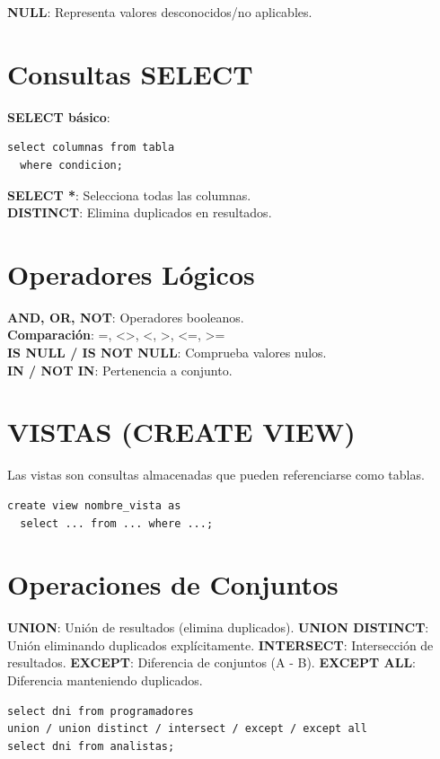 \documentclass[8pt,a4paper,twocolumn]{article}
\begin{document}
\textbf{NULL}: Representa valores desconocidos/no aplicables.

\section{Consultas SELECT}

\textbf{SELECT básico}:
\begin{lstlisting}
select columnas from tabla
  where condicion;
\end{lstlisting}

\textbf{SELECT *}: Selecciona todas las columnas.\\
\textbf{DISTINCT}: Elimina duplicados en resultados.

\section{Operadores Lógicos}

\textbf{AND, OR, NOT}: Operadores booleanos.\\
\textbf{Comparación}: =, \textless\textgreater, \textless, \textgreater, \textless=, \textgreater=\\
\textbf{IS NULL / IS NOT NULL}: Comprueba valores nulos.\\
\textbf{IN / NOT IN}: Pertenencia a conjunto.

\section{VISTAS (CREATE VIEW)}

Las vistas son consultas almacenadas que pueden referenciarse como tablas.

\begin{lstlisting}
create view nombre_vista as
  select ... from ... where ...;
\end{lstlisting}

\section{Operaciones de Conjuntos}

\textbf{UNION}: Unión de resultados (elimina duplicados).
\textbf{UNION DISTINCT}: Unión eliminando duplicados explícitamente.
\textbf{INTERSECT}: Intersección de resultados.
\textbf{EXCEPT}: Diferencia de conjuntos (A - B).
\textbf{EXCEPT ALL}: Diferencia manteniendo duplicados.

\begin{lstlisting}
select dni from programadores
union / union distinct / intersect / except / except all
select dni from analistas;
\end{lstlisting}
\end{document}
